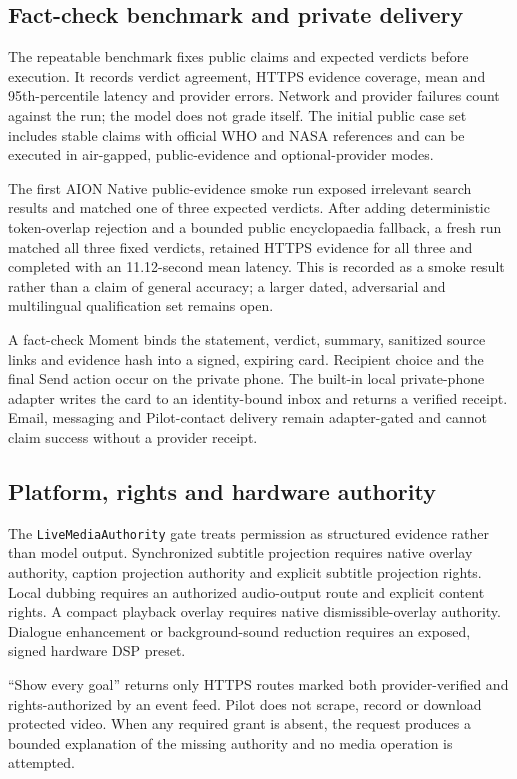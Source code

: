 \subsection{Fact-check benchmark and private delivery}

The repeatable benchmark fixes public claims and expected verdicts before execution.  It
records verdict agreement, HTTPS evidence coverage, mean and 95th-percentile latency and
provider errors.  Network and provider failures count against the run; the model does not
grade itself.  The initial public case set includes stable claims with official WHO and
NASA references and can be executed in air-gapped, public-evidence and optional-provider
modes.

The first AION Native public-evidence smoke run exposed irrelevant search results and
matched one of three expected verdicts.  After adding deterministic token-overlap
rejection and a bounded public encyclopaedia fallback, a fresh run matched all three fixed
verdicts, retained HTTPS evidence for all three and completed with an 11.12-second mean
latency.  This is recorded as a smoke result rather than a claim of general accuracy; a
larger dated, adversarial and multilingual qualification set remains open.

A fact-check Moment binds the statement, verdict, summary, sanitized source links and
evidence hash into a signed, expiring card.  Recipient choice and the final Send action
occur on the private phone.  The built-in local private-phone adapter writes the card to an
identity-bound inbox and returns a verified receipt.  Email, messaging and Pilot-contact
delivery remain adapter-gated and cannot claim success without a provider receipt.

\subsection{Platform, rights and hardware authority}

The \texttt{LiveMediaAuthority} gate treats permission as structured evidence rather than
model output.  Synchronized subtitle projection requires native overlay authority, caption
projection authority and explicit subtitle projection rights.  Local dubbing requires an
authorized audio-output route and explicit content rights.  A compact playback overlay
requires native dismissible-overlay authority.  Dialogue enhancement or background-sound
reduction requires an exposed, signed hardware DSP preset.

``Show every goal'' returns only HTTPS routes marked both provider-verified and
rights-authorized by an event feed.  Pilot does not scrape, record or download protected
video.  When any required grant is absent, the request produces a bounded explanation of
the missing authority and no media operation is attempted.


